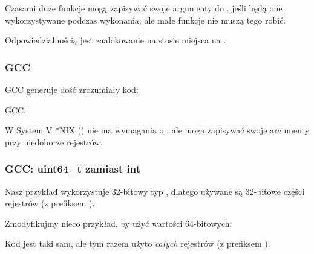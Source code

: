 Czasami duże funkcje mogą zapisywać swoje argumenty do , jeśli będą one wykorzystywane podczas wykonania,
ale małe funkcje nie muszą tego robić.

Odpowiedzialnością  jest zaalokowanie na stosie miejsca na .

\subsubsection{GCC}

\Optimizing GCC generuje dość zrozumiały kod:



\NonOptimizing GCC:




W System V *NIX (\SysVABI) nie ma wymagania o , ale  mogą zapisywać swoje argumenty przy niedoborze rejestrów.

\subsubsection{GCC: uint64\_t zamiast int}

Nasz przykład wykorzystuje 32-bitowy typ \Tint, dlatego używane są 32-bitowe części rejestrów (z prefiksem ).

Zmodyfikujmy nieco przykład, by użyć wartości 64-bitowych:





Kod jest taki sam, ale tym razem użyto \emph{całych} rejestrów (z prefiksem ).

